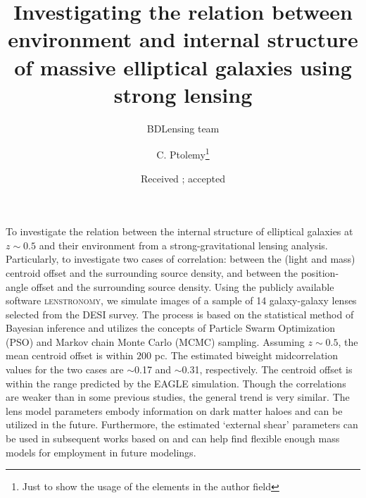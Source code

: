 \documentclass{aa}
\begin{document}
 


   \title{Investigating the relation between environment and internal structure of massive elliptical galaxies using strong lensing}

   \subtitle{}

   \author{BDLensing team
          \and
          C. Ptolemy\fnmsep\thanks{Just to show the usage
          of the elements in the author field}
          }


   \date{Received ; accepted }

 
  \abstract
  {}
   {To investigate the relation between the internal structure of elliptical galaxies at $z \sim 0.5$ and their environment from a strong-gravitational lensing analysis. Particularly, to investigate two cases of correlation: between the (light and mass) centroid offset and the surrounding source density, and between the position-angle offset and the surrounding source density.}
   {Using the publicly available software \textsc{lenstronomy}, we simulate images of a sample of 14 galaxy-galaxy lenses selected from the DESI survey. The process is based on the statistical method of Bayesian inference and utilizes the concepts of Particle Swarm Optimization (PSO) and Markov chain Monte Carlo (MCMC) sampling.}
   {Assuming $z \sim 0.5$, the mean centroid offset is within $200$ pc. The estimated biweight midcorrelation values for the two cases are $\sim$0.17 and $\sim$0.31, respectively.}
   {The centroid offset is within the range predicted by the EAGLE simulation. Though the correlations are weaker than in some previous studies, the general trend is very similar. The lens model parameters embody information on dark matter haloes and can be utilized in the future. Furthermore, the estimated `external shear' parameters can be used in subsequent works based on \cite{Etherington23} and can help find flexible enough mass models for employment in future modelings.}
\end{document}
